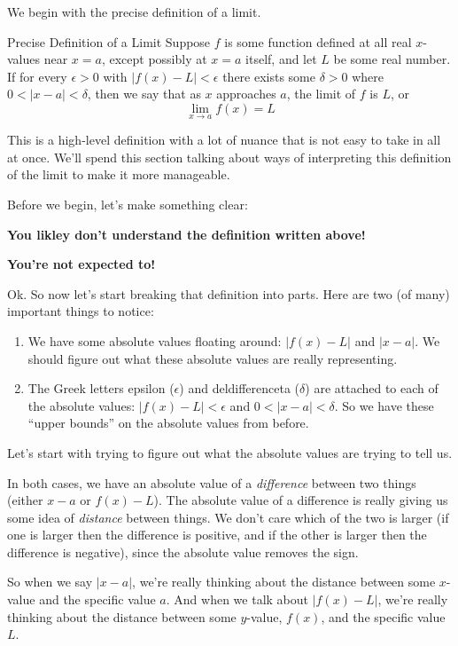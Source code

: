 
We begin with the precise definition of a limit.

\begin{defn}{Precise Definition of a Limit}
  Suppose $f$ is some function defined at all real $x$-values near $x=a$, except possibly at $x=a$ itself, and let $L$ be some real number. If for every $\epsilon>0$ with $|f(x)-L|<\epsilon$ there exists some $\delta>0$ where $0<|x-a|<\delta$, then we say that as $x$ approaches $a$, the limit of $f$ is $L$, or
  \[ \lim_{x\to a} f(x) = L\]
\end{defn}

This is a high-level definition with a lot of nuance that is not easy to take in all at once. We'll spend this section talking about ways of interpreting this definition of the limit to make it more manageable.

Before we begin, let's make something clear:

\begin{center}
  \textbf{You likley don't understand the definition written above!}

  \textbf{You're not expected to!}
\end{center}

Ok. So now let's start breaking that definition into parts. Here are two (of many) important things to notice:
\begin{enumerate}
  \item We have some absolute values floating around: $|f(x)-L|$ and $|x-a|$. We should figure out what these absolute values are really representing.
  \item The Greek letters epsilon ($\epsilon$) and deldifferenceta ($\delta$) are attached to each of the absolute values: $|f(x)-L|<\epsilon$ and $0<|x-a|<\delta$. So we have these ``upper bounds'' on the absolute values from before.
\end{enumerate}

Let's start with trying to figure out what the absolute values are trying to tell us.

In both cases, we have an absolute value of a \textit{difference} between two things (either $x-a$ or $f(x)-L$). The absolute value of a difference is really giving us some idea of \textit{distance} between things. We don't care which of the two is larger (if one is larger then the difference is positive, and if the other is larger then the difference is negative), since the absolute value removes the sign.

So when we say $|x-a|$, we're really thinking about the distance between some $x$-value and the specific value $a$. And when we talk about $|f(x)-L|$, we're really thinking about the distance between some $y$-value, $f(x)$, and the specific value $L$.

